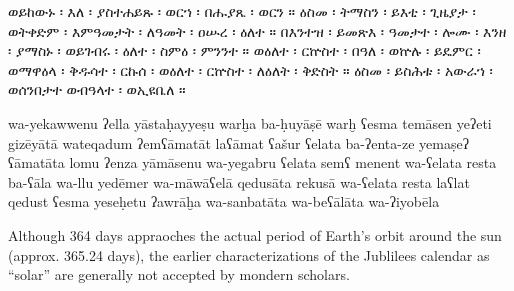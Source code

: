 \begin{ethiopictext}
    ወይከውኑ ፡ እለ ፡ ያስተሐይጹ ፡ ወርኀ ፡ በሑያጼ ፡ ወርን ።
    ዕስመ ፡ ትማስን ፡ ይእቲ ፡ ጊዜያታ ፡ ወትቀድም ፡ እምዓመታት ፡ ለዓመት ፡ ዐሡረ ፡ ዕለተ ።
    በእንተዝ ፡ ይመጽእ ፡ ዓመታተ ፡ ሎሙ ፡ እንዘ ፡ ያማስኑ ፡ ወይገብሩ ፡ ዕለተ ፡ ስምዕ ፡ ምንንተ ።
    ወዕለተ ፡ ርኵስተ ፡ በዓለ ፡ ወኵሉ ፡ ይዴምር ፡ ወማዋዕላ ፡ 
        ቅዱሳተ ፡ ርኩሰ ፡ ወዕለተ ፡ ርኵስተ ፡ ለዕለት ፡ ቅድስት ።
    ዕስመ ፡ ይስሕቱ ፡ አውራኀ ፡ ወሰንበታተ ወብዓላተ ፡ ወኢዩቤለ ።
\end{ethiopictext}
\begin{transliteration}
    wa-yekawwenu ʔella yāstaḥayyeṣu warḫa ba-ḥuyāṣē warḫ
    ʕesma temāsen yeʔeti gizēyātā wateqadum ʔemʕāmatāt laʕāmat ʕašur ʕelata
    ba-ʔenta-ze yemaṣeʔ ʕāmatāta lomu ʔenza yāmāsenu wa-yegabru ʕelata semʕ menent
    wa-ʕelata resta ba-ʕāla wa-llu yedēmer wa-māwāʕelā 
        qedusāta rekusā wa-ʕelata resta laʕlat qedust
    ʕesma yeseḥetu ʔawrāḫa wa-sanbatāta wa-beʕālāta wa-ʔiyobēla
\end{transliteration}
\begin{translation}
\end{translation}

Although 364 days appraoches the actual period of Earth's orbit around the sun (approx. 365.24 days), the earlier characterizations of the Jublilees calendar as ``solar''  are generally not accepted by mondern scholars. 




